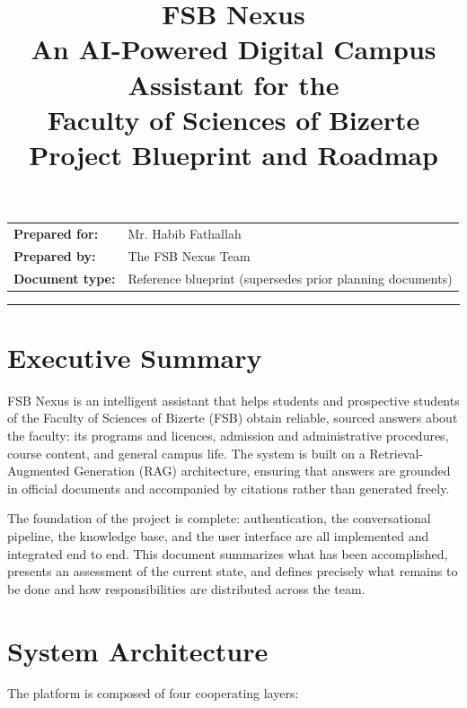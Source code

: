 \documentclass[11pt,a4paper]{article}
\title{\vspace{-1.2cm}\textbf{\color{fsbblue}FSB Nexus}\\[0.3em]
\large An AI-Powered Digital Campus Assistant for the\\Faculty of Sciences of Bizerte\\[0.6em]
\normalsize Project Blueprint and Roadmap}
\author{}
\date{}
\begin{document}
\maketitle
\vspace{-1.5cm}

\begin{center}
\small
\begin{tabular}{ll}
\textbf{Prepared for:} & Mr. Habib Fathallah \\
\textbf{Prepared by:} & The FSB Nexus Team \\
\textbf{Document type:} & Reference blueprint (supersedes prior planning documents) \\
\end{tabular}
\end{center}

\vspace{0.4cm}
\hrule
\vspace{0.4cm}

\section{Executive Summary}

FSB Nexus is an intelligent assistant that helps students and prospective students
of the Faculty of Sciences of Bizerte (FSB) obtain reliable, sourced answers about
the faculty: its programs and licences, admission and administrative procedures,
course content, and general campus life. The system is built on a
Retrieval-Augmented Generation (RAG) architecture, ensuring that answers are grounded
in official documents and accompanied by citations rather than generated freely.

The foundation of the project is complete: authentication, the conversational
pipeline, the knowledge base, and the user interface are all implemented and
integrated end to end. This document summarizes what has been accomplished, presents
an assessment of the current state, and defines precisely what remains to be done and
how responsibilities are distributed across the team.

\section{System Architecture}

The platform is composed of four cooperating layers:
\end{document}
